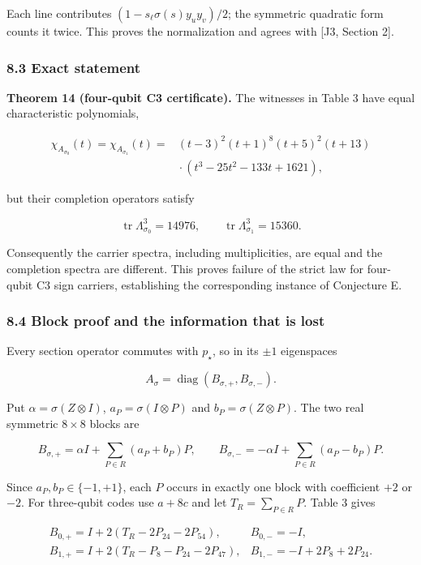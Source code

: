 \documentclass[11pt,a4paper]{article}
\begin{document}
Each line contributes \((1-s_\ell\sigma(s)y_uy_v)/2\); the symmetric quadratic form counts it twice.
This proves the normalization and agrees with {[}J3, Section 2{]}.

\subsubsection{8.3 Exact statement}\label{83-exact-statement}

\textbf{Theorem 14 (four-qubit C3 certificate).} The witnesses in Table 3 have equal characteristic
polynomials,

\[\begin{aligned}
\chi_{A_{\sigma_0}}(t)=\chi_{A_{\sigma_1}}(t)
={}&(t-3)^2(t+1)^8(t+5)^2(t+13)\\ &{}\cdot(t^3-25t^2-133t+1621),
\end{aligned}
\tag{C2}\]

but their completion operators satisfy

\[\operatorname{tr}\Lambda_{\sigma_0}^3=14976,\qquad
\operatorname{tr}\Lambda_{\sigma_1}^3=15360.
\tag{C3}\]

Consequently the carrier spectra, including multiplicities, are equal and the completion spectra
are different. This proves failure of the strict law for four-qubit C3 sign carriers, establishing
the corresponding instance of Conjecture E.

\subsubsection{8.4 Block proof and the information that is lost}\label{84-block-proof-and-the-information-that-is-lost}

Every section operator commutes with \(p_\star\), so in its \(\pm1\) eigenspaces

\[A_\sigma=\operatorname{diag}(B_{\sigma,+},B_{\sigma,-}).\]

Put \(\alpha=\sigma(Z\otimes I)\), \(a_P=\sigma(I\otimes P)\) and \(b_P=\sigma(Z\otimes P)\). The
two real symmetric \(8\times8\) blocks are

\[B_{\sigma,+}=\alpha I+\sum_{P\in R}(a_P+b_P)P,\qquad
B_{\sigma,-}=-\alpha I+\sum_{P\in R}(a_P-b_P)P.
\tag{C4}\]

Since \(a_P,b_P\in\{-1,+1\}\), each \(P\) occurs in exactly one block with coefficient \(+2\) or \(-2\).
For three-qubit codes use \(a+8c\) and let \(T_R=\sum_{P\in R}P\). Table 3 gives

\[\begin{array}{ll}
B_{0,+}=I+2(T_R-2P_{24}-2P_{54}),& B_{0,-}=-I,\\ B_{1,+}=I+2(T_R-P_8-P_{24}-2P_{47}),& B_{1,-}=-I+2P_8+2P_{24}.
\end{array}
\tag{C5}\]
\end{document}
